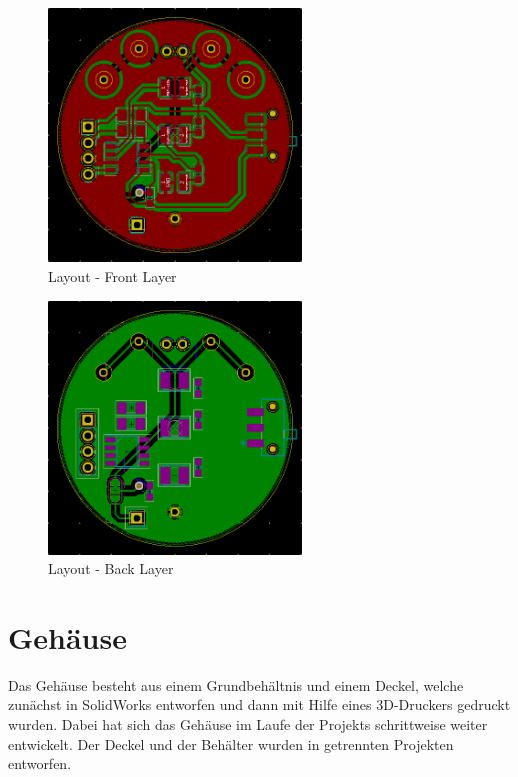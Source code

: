 \documentclass[a4paper,
DIV=13,
12pt,
BCOR=10mm,
department=FakEI,
parskip=half,
automark,
]{article}
\begin{document}
\begin{figure}[!hbpt]
 \begin{center}\includegraphics[width=0.6\textwidth]{Layout_Front.png}
 \caption{Layout - Front Layer}
 \label{fig:Front}
 \end{center}
\end{figure}

\begin{figure}[!hbpt]
 \begin{center} \includegraphics[width=0.6\textwidth]{Layout_Back.png}
 \caption{Layout - Back Layer}
 \label{fig:Back}
  \end{center}
\end{figure}

\newpage

\section{Gehäuse}
Das Gehäuse besteht aus einem Grundbehältnis und einem Deckel, welche zunächst in SolidWorks entworfen und dann mit Hilfe eines 3D-Druckers gedruckt wurden. Dabei hat sich das Gehäuse im Laufe der Projekts schrittweise weiter entwickelt. Der Deckel und der Behälter wurden in getrennten Projekten entworfen. 
\end{document}
